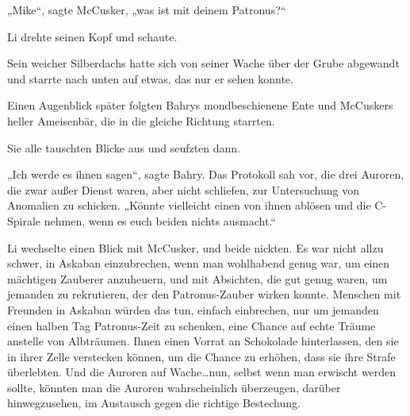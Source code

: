 „Mike“, sagte McCusker, „was ist mit deinem Patronus?“

Li drehte seinen Kopf und schaute.

Sein weicher Silberdachs hatte sich von seiner Wache über der Grube abgewandt und starrte nach unten auf etwas, das nur er sehen konnte.

Einen Augenblick später folgten Bahrys mondbeschienene Ente und McCuskers heller Ameisenbär, die in die gleiche Richtung starrten.

Sie alle tauschten Blicke aus und seufzten dann.

„Ich werde es ihnen sagen“, sagte Bahry. Das Protokoll sah vor, die drei Auroren, die zwar außer Dienst waren, aber nicht schliefen, zur Untersuchung von Anomalien zu schicken. „Könnte vielleicht einen von ihnen ablösen und die C-Spirale nehmen, wenn es euch beiden nichts ausmacht.“

Li wechselte einen Blick mit McCusker, und beide nickten. Es war nicht allzu schwer, in Askaban einzubrechen, wenn man wohlhabend genug war, um einen mächtigen Zauberer anzuheuern, und mit Absichten, die gut genug waren, um jemanden zu rekrutieren, der den Patronus-Zauber wirken konnte. Menschen mit Freunden in Askaban würden das tun, einfach einbrechen, nur um jemanden einen halben Tag Patronus-Zeit zu schenken, eine Chance auf echte Träume anstelle von Albträumen. Ihnen einen Vorrat an Schokolade hinterlassen, den sie in ihrer Zelle verstecken können, um die Chance zu erhöhen, dass sie ihre Strafe überlebten. Und die Auroren auf Wache…nun, selbst wenn man erwischt werden sollte, könnten man die Auroren wahrscheinlich überzeugen, darüber hinwegzusehen, im Austausch gegen die richtige Bestechung.

